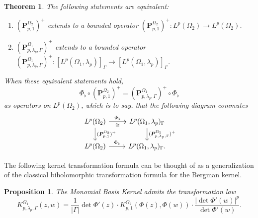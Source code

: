 \documentclass[letterpaper,11pt,reqno]{amsart}
\theoremstyle{plain}
\newtheorem{theorem}[equation]{Theorem}
\newtheorem{proposition}[equation]{Proposition}
\theoremstyle{definition}
\theoremstyle{remark}
\theoremstyle{remark}
\numberwithin{equation}{section}
\begin{document}
\begin{theorem}\label{T:Abs-boundedness-equivalence}
The following statements are equivalent:
\begin{enumerate}
\item $(\bm{P}^{\Omega_2}_{p,1})^+$ extends to a bounded operator $(\bm{P}^{\Omega_2}_{p,1})^+: L^p(\Omega_2) \to L^p(\Omega_2)$.
\item $(\bm{P}^{\Omega_1}_{p,\lambda_p,\Gamma})^+$ extends to a bounded operator
$(\bm{P}^{\Omega_1}_{p,\lambda_p,\Gamma})^+: [L^p(\Omega_1,\lambda_p)]_\Gamma \to [L^p(\Omega_1,\lambda_p)]_\Gamma$.
\end{enumerate}
When these equivalent statements hold, 
\begin{equation}\label{E:AbsMBO-and-Phi_flat}
    \Phi_\flat \circ (\bm{P}_{p,1}^{\Omega_2})^+ = (\bm{P}_{p,\lambda_p,\Gamma}^{\Omega_1})^+ \circ \Phi_\flat
\end{equation}
as operators on $L^p(\Omega_2)$, which is to say, that the following diagram commutes
\begin{equation}\label{Diagram-absoulte-MBP}
\begin{tikzcd}			
{L}^p(\Omega_2) \arrow[r,"{\Phi}_\flat"] \arrow[r,swap,"\cong"] \arrow[d, "(\bm{P}_{p,1}^{\Omega_2})^+"] 
& L^p(\Omega_1, \lambda_p)_\Gamma \arrow[d,"(\bm{P}^{\Omega_1}_{p,\lambda_p,\Gamma})^+"] 
\\
L^p(\Omega_2)
\arrow[r,"{\Phi}_{\flat}"]
& L^p(\Omega_1, \lambda_p)_\Gamma.
\end{tikzcd}
\end{equation}
\end{theorem}
The following kernel transformation formula can be thought of as a generalization of the classical biholomorphic transformation formula for the Bergman kernel.
\begin{proposition}\label{P:MBK-proper-trans-law}
The Monomial Basis Kernel admits the transformation law
\begin{equation}\label{E:MBK-proper-trans-law}
    K^{\Omega_1}_{p,\lambda_p,\Gamma}(z,w) = \frac{1}{|\Gamma|} \det \Phi'(z) \cdot K^{\Omega_2}_{p,1}(\Phi(z),\Phi(w)) \cdot \frac{|\det \Phi'(w)|^p}{\det \Phi'(w)}.
\end{equation}
\end{proposition}
\end{document}
